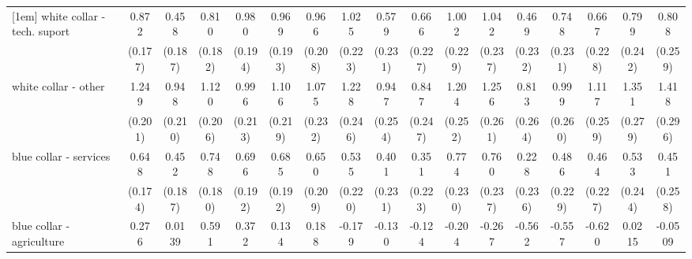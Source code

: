 {\begin{tabular}{l*{16}{c}}
[1em]
white collar - tech. suport&       0.872\sym{***}&       0.458\sym{*}  &       0.810\sym{***}&       0.980\sym{***}&       0.969\sym{***}&       0.966\sym{***}&       1.025\sym{***}&       0.579\sym{*}  &       0.666\sym{**} &       1.002\sym{***}&       1.042\sym{***}&       0.469\sym{*}  &       0.748\sym{**} &       0.667\sym{**} &       0.799\sym{***}&       0.808\sym{**} \\
                    &     (0.177)         &     (0.187)         &     (0.182)         &     (0.194)         &     (0.193)         &     (0.208)         &     (0.223)         &     (0.231)         &     (0.227)         &     (0.229)         &     (0.237)         &     (0.232)         &     (0.231)         &     (0.228)         &     (0.242)         &     (0.259)         \\
[1em]
white collar - other&       1.249\sym{***}&       0.948\sym{***}&       1.120\sym{***}&       0.996\sym{***}&       1.106\sym{***}&       1.075\sym{***}&       1.228\sym{***}&       0.947\sym{***}&       0.847\sym{***}&       1.204\sym{***}&       1.256\sym{***}&       0.813\sym{**} &       0.999\sym{***}&       1.117\sym{***}&       1.351\sym{***}&       1.418\sym{***}\\
                    &     (0.201)         &     (0.210)         &     (0.206)         &     (0.213)         &     (0.219)         &     (0.232)         &     (0.246)         &     (0.254)         &     (0.247)         &     (0.252)         &     (0.261)         &     (0.264)         &     (0.260)         &     (0.259)         &     (0.279)         &     (0.296)         \\
[1em]
blue collar - services&       0.648\sym{***}&       0.452\sym{*}  &       0.748\sym{***}&       0.696\sym{***}&       0.685\sym{***}&       0.650\sym{**} &       0.535\sym{*}  &       0.401         &       0.351         &       0.774\sym{***}&       0.760\sym{**} &       0.228         &       0.486\sym{*}  &       0.464\sym{*}  &       0.533\sym{*}  &       0.451         \\
                    &     (0.174)         &     (0.187)         &     (0.180)         &     (0.192)         &     (0.192)         &     (0.209)         &     (0.220)         &     (0.231)         &     (0.223)         &     (0.230)         &     (0.237)         &     (0.236)         &     (0.229)         &     (0.227)         &     (0.244)         &     (0.258)         \\
[1em]
blue collar - agriculture&       0.276         &      0.0139         &       0.591\sym{*}  &       0.372         &       0.134         &       0.188         &      -0.179         &      -0.130         &      -0.124         &      -0.204         &      -0.267         &      -0.562         &      -0.557         &      -0.620         &      0.0215         &     -0.0509         \\

\end{tabular}}

